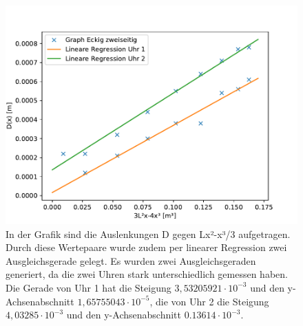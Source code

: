 \documentclass[titlepage = firstcover]{scrartcl}
\begin{document}
        \begin{figure}[h]
          \centering
          \includegraphics[width=0.7\linewidth]{ezwei.pdf}
          \caption{In der Grafik sind die Auslenkungen D gegen Lx²-x³/3 aufgetragen. Durch diese Wertepaare wurde zudem per linearer Regression zwei Ausgleichsgerade gelegt. Es wurden zwei Ausgleichsgeraden generiert, da die zwei Uhren stark unterschiedlich gemessen haben. Die Gerade von Uhr 1 hat die Steigung $3,53205921\cdot10^{-3}$ und den y-Achsenabschnitt $1,65755043\cdot10^{-5}$, die von Uhr 2 die Steigung $4,03285\cdot10^{-3}$ und den y-Achsenabschnitt $0.13614\cdot10^{-3}$.}
          \label{fig:graphEzwei}
        \end{figure}
      \newpage
\end{document}
